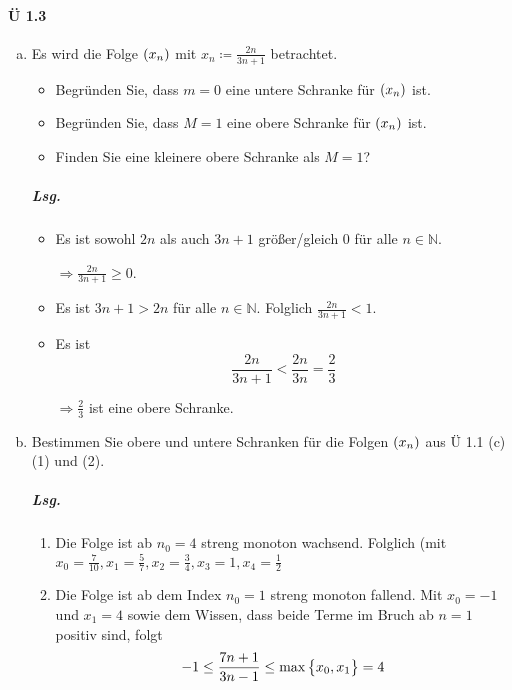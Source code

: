 \documentclass{scrreprt}
\begin{document}
\newpage
\paragraph{Ü 1.3}
\begin{enumerate}[(a)]
\item Es wird die Folge $\qty(x_n)$ mit $x_n \coloneqq \frac{2n}{3n + 1}$
  betrachtet.
  \begin{itemize}
  \item Begründen Sie, dass $m = 0$ eine untere Schranke für $\qty(x_n)$ ist.
  \item Begründen Sie, dass $M = 1$ eine obere Schranke für $\qty(x_n)$ ist.
  \item Finden Sie eine kleinere obere Schranke als $M = 1$?
  \end{itemize}

  \subparagraph{Lsg.}
  \begin{itemize}
  \item Es ist sowohl $2n$ als auch $3n + 1$ größer/gleich 0 für alle
    $n \in \mathbb{N}$.

    $\Rightarrow \frac{2n}{3n + 1} \geq 0$.

  \item Es ist $3n + 1 > 2n$ für alle $n \in \mathbb{N}$.
    Folglich $\frac{2n}{3n + 1} < 1$.

  \item Es ist
    \[
      \frac{2n}{3n + 1} < \frac{2n}{3n} = \frac{2}{3}
    \]

    $\Rightarrow \frac{2}{3}$ ist eine obere Schranke.
  \end{itemize}
\item Bestimmen Sie obere und untere Schranken für die Folgen $\qty(x_n)$ aus
  Ü 1.1 (c) (1) und (2).

  \subparagraph{Lsg.}
  \begin{enumerate}[(1)]
  \item Die Folge ist ab $n_0 = 4$ streng monoton wachsend.
    Folglich (mit $x_0 = \frac{7}{10}, x_1 = \frac{5}{7}, x_2 = \frac{3}{4}, x_3 = 1, x_4 = \frac{1}{2}$

  \item Die Folge ist ab dem Index $n_0 = 1$ streng monoton fallend.
    Mit $x_0 = -1$ und $x_1 = 4$ sowie dem Wissen, dass beide Terme im Bruch
    ab $n = 1$ positiv sind, folgt
    \[
      -1 \leq \frac{7n + 1}{3n - 1} \leq \max\qty\big{x_0, x_1} = 4
    \]
  \end{enumerate}


\end{enumerate}
\end{document}
